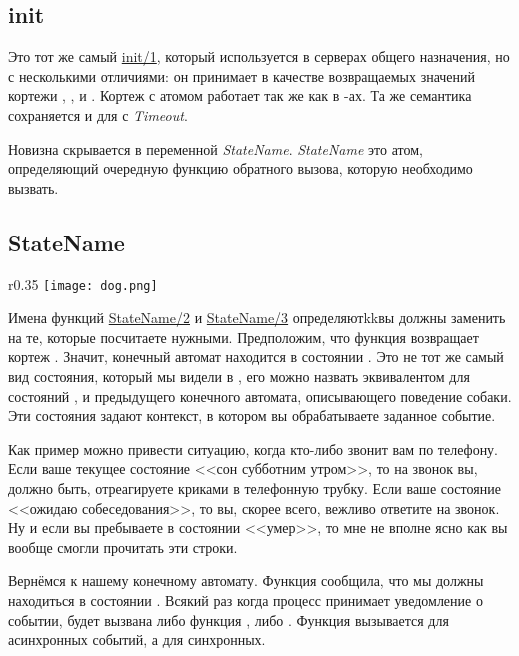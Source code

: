 \subsection{init}
\label{init2}
Это тот же самый \href{http://erldocs.com/R15B/stdlib/gen\_fsm.html\#init/1}{init/1}, который используется в серверах общего назначения, но с несколькими отличиями: он принимает в качестве возвращаемых значений кортежи , ,  и .
Кортеж с атомом  работает так же как в \--ах.
Та же семантика сохраняется и для  с \emph{Timeout}.

Новизна скрывается в переменной \emph{StateName}.
\emph{StateName} это атом, определяющий очередную функцию обратного вызова, которую необходимо вызвать.
\subsection{StateName}
\label{statename}
\begin{wrapfigure}{r}{0.35\linewidth}
    \texttt{[image: dog.png]}
\end{wrapfigure}
Имена функций \href{http://erldocs.com/R15B/stdlib/gen\_fsm.html\#StateName/2}{StateName/2} и \href{http://erldocs.com/R15B/stdlib/gen\_fsm.html\#StateName/2}{StateName/3} определяютkkвы должны заменить на те, которые посчитаете нужными.
Предположим, что функция  возвращает кортеж .
Значит, конечный автомат находится в состоянии .
Это не тот же самый вид состояния, который мы видели в , его можно назвать эквивалентом для состояний ,  и  предыдущего конечного автомата, описывающего поведение собаки.
Эти состояния задают контекст, в котором вы обрабатываете заданное событие.

Как пример можно привести ситуацию, когда кто\--либо звонит вам по телефону.
Если ваше текущее состояние <<сон субботним утром>>, то на звонок вы, должно быть, отреагируете криками в телефонную трубку.
Если ваше состояние <<ожидаю собеседования>>, то вы, скорее всего, вежливо ответите на звонок.
Ну и если вы пребываете в состоянии <<умер>>, то мне не вполне ясно как вы вообще смогли прочитать эти строки.

Вернёмся к нашему конечному автомату.
Функция  сообщила, что мы должны находиться в состоянии .
Всякий раз когда процесс  принимает уведомление о событии, будет вызвана либо функция , либо .
Функция  вызывается для асинхронных событий, а  для синхронных.

